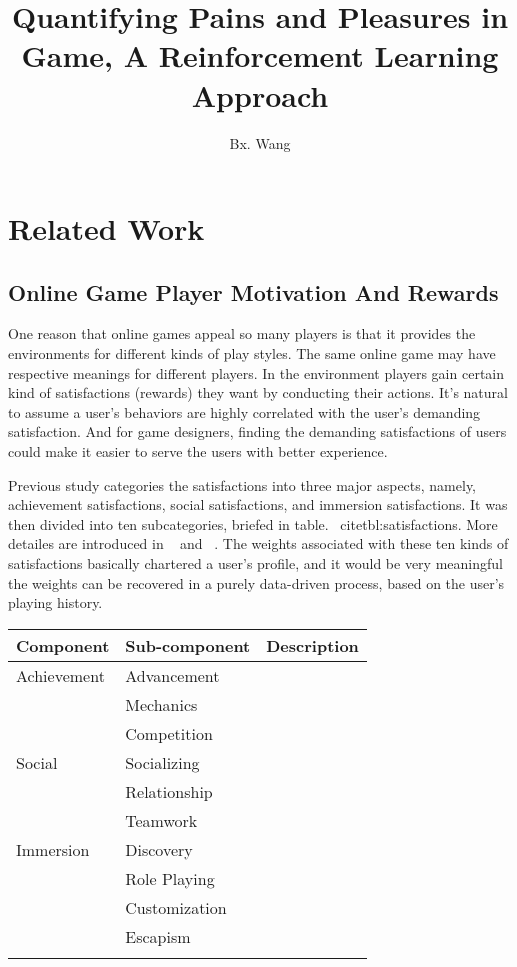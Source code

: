 \documentclass[a4paper]{article}
\title{Quantifying Pains and Pleasures in Game, A Reinforcement Learning Approach}
\author{Bx. Wang}
\begin{document}
\maketitle

\section{Related Work}

\subsection{Online Game Player Motivation And Rewards}

One reason that online games appeal so many players is that it provides the environments for different kinds of play styles. The same online game may have respective meanings for different players. In the environment players gain certain kind of satisfactions (rewards) they want by conducting their actions. It's natural to assume a user's behaviors are highly correlated with the user's demanding satisfaction. And for game designers, finding the demanding satisfactions of users could make it easier to serve the users with better experience. 

Previous study categories the satisfactions into three major aspects, namely, achievement satisfactions, social satisfactions, and immersion satisfactions. It was then divided into ten subcategories, briefed in table. ~cite{tbl:satisfactions}. More detailes are introduced in ~\cite{} and ~\cite{}. The weights associated with these ten kinds of satisfactions basically chartered a user's profile, and it would be very meaningful the weights can be recovered in a purely data-driven process, based on the user's playing history.

\begin{tabular}{l|l|p{9cm}}
    \toprule
    Component  &Sub-component & Description \\
    \midrule
    Achievement & Advancement &  \\
     & Mechanics &  \\
     & Competition &  \\
    Social & Socializing &  \\
     & Relationship &  \\
     & Teamwork &  \\
    Immersion & Discovery &  \\
     & Role Playing &  \\
     & Customization &  \\
     & Escapism &  \\
    \bottomrule
    \label{tbe:satisfactions}
\end{tabular}
\end{document}
